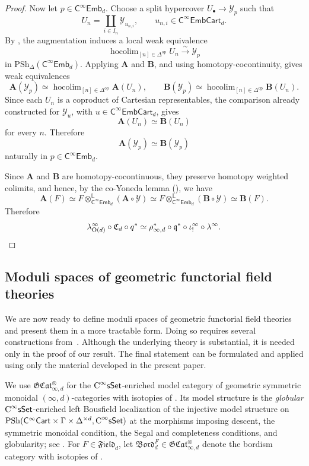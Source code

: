 \documentclass{amsart}
\newcommand{\cat}[1]{\mathsf{#1}}
\newcommand{\sset}{\cat{sSet}}
\DeclareMathOperator*{\hocolim}{hocolim}
\newcommand{\CsSet}{\textnormal{C}^{\infty}\sset}
\newcommand{\field}[1]{\mathfrak{Field}_{#1}}
\newcommand{\Cart}{\cat{C}^{\infty}\cat{Cart}}
\newcommand{\fembnoniso}[1]{\cat{C}^{\infty}\cat{Emb}_{#1}}
\newcommand{\fembcartnoniso}[1]{\cat{C}^{\infty}\cat{EmbCart}_{#1}}
\newcommand{\Bord}{\mathfrak{Bord}}
\newcommand{\GCat}{\mathfrak{G}\mathfrak{Cat}}
\newcommand{\psh}{\mathrm{PSh}}
\newcommand{\spsh}{\mathrm{PSh}_{\Delta}}
\newcommand{\Cc}{\mathfrak{C}}
\renewcommand{\op}{\mathrm{op}}
\newcommand{\Yo}{\mathscr{Y}}
\theoremstyle{definition}
\numberwithin{equation}{subsection}
\numberwithin{subsubsection}{subsection}
\begin{document}
\begin{proof}
  Now let \(p\in\fembnoniso{d}\). Choose a split hypercover
  \(U_{\bullet}\to\Yo_p\) such that
  \[
    U_n=\coprod_{i\in I_n}\Yo_{u_{n,i}},
    \qquad
    u_{n,i}\in\fembcartnoniso{d}.
  \]
  By , the augmentation induces
  a local weak equivalence
  \[
    \hocolim_{[n]\in\Delta^{\op}}U_n
    \xrightarrow{\sim}
    \Yo_p
  \]
  in \(\spsh(\fembnoniso{d})\). Applying \(\mathbf{A}\) and
  \(\mathbf{B}\), and using homotopy-cocontinuity, gives weak equivalences
  \[
    \mathbf{A}(\Yo_p)
    \simeq
    \hocolim_{[n]\in\Delta^{\op}}\mathbf{A}(U_n),
    \qquad
    \mathbf{B}(\Yo_p)
    \simeq
    \hocolim_{[n]\in\Delta^{\op}}\mathbf{B}(U_n).
  \]
  Since each \(U_n\) is a coproduct of Cartesian representables, the
  comparison already constructed for \(\Yo_u\), with
  \(u\in\fembcartnoniso{d}\), gives
  \[
    \mathbf{A}(U_n)\simeq \mathbf{B}(U_n)
  \]
  for every \(n\).  Therefore
  \[
    \mathbf{A}(\Yo_p)\simeq \mathbf{B}(\Yo_p)
  \]
  naturally in \(p\in\fembnoniso{d}\).

  Since \(\mathbf{A}\) and \(\mathbf{B}\) are homotopy-cocontinuous, they
  preserve homotopy weighted colimits, and hence, by the co-Yoneda lemma
  (), we have
  \[
    \mathbf{A}(F)
    \simeq
    F\otimes^{\mathbb{L}}_{\fembnoniso{d}}(\mathbf{A}\circ\Yo)
    \simeq
    F\otimes^{\mathbb{L}}_{\fembnoniso{d}}(\mathbf{B}\circ\Yo)
    \simeq
    \mathbf{B}(F).
  \]
  Therefore
  \[
    \lambda^{\infty}_{\mathrm{O}(d)}\circ \Cc_d\circ q^{*}
    \simeq
    \rho_{\infty,d}^{*}\circ \mathfrak{q}^{*}\circ
  \iota_{!}^{\infty}\circ\lambda^{\infty}.\qedhere\]
\end{proof}

\subsection{Moduli spaces of geometric functorial field
theories}\label{subsec:moduli.spaces.functorial.field.theories}

We are now ready to define moduli spaces of geometric functorial field theories
and present them in a more tractable form. Doing so requires several
constructions from~\cite{GP26}. Although the underlying theory is substantial,
it is needed only in the proof of our result. The final statement can be
formulated and applied using only the material developed in the present paper.

We use \(\GCat_{\infty,d}^{\otimes}\) for the
\(\CsSet\)-enriched model category of geometric symmetric monoidal
\((\infty,d)\)-categories with isotopies of
\cite[Definition~3.1.8(2)]{GP26}. Its model structure is the \emph{globular}
\(\CsSet\)-enriched left Bousfield localization of the injective model
structure on
\(\psh(\Cart\times\Gamma\times\Delta^{\times d},\CsSet)\)
at the morphisms imposing descent, the symmetric monoidal condition, the
Segal and completeness conditions, and globularity; see
\cite[Proposition~3.1.7]{GP26}. For \(F\in\field{d}\), let
\(\Bord_d^F\in\GCat_{\infty,d}^{\otimes}\) denote the bordism category
with isotopies of \cite[Definition~5.3.16]{GP26}.
\end{document}

